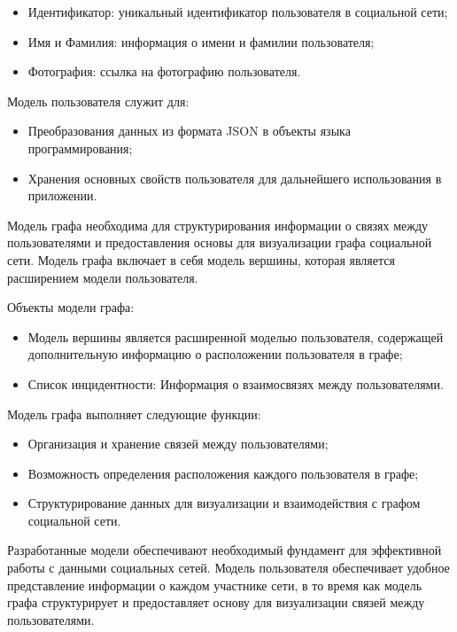 \documentclass[14pt, russian]{scrartcl}
\begin{document}
\begin{itemize}
	\item Идентификатор: уникальный идентификатор пользователя в социальной сети;
	\item Имя и Фамилия: информация о имени и фамилии пользователя;
	\item Фотография: ссылка на фотографию пользователя.
\end{itemize}


Модель пользователя служит для:

\begin{itemize}
	\item Преобразования данных из формата JSON в объекты языка программирования;
	\item Хранения основных свойств пользователя для дальнейшего использования в приложении.
\end{itemize}

Модель графа необходима для структурирования информации о связях между пользователями и предоставления основы для визуализации графа социальной сети. Модель графа включает в себя модель вершины, которая является расширением модели пользователя.


Объекты модели графа:

\begin{itemize}
	\item Модель вершины является расширенной моделью пользователя, содержащей дополнительную информацию о расположении пользователя в графе;
	\item Список инцидентности: Информация о взаимосвязях между пользователями.
\end{itemize}

Модель графа выполняет следующие функции:

\begin{itemize}
	\item Организация и хранение связей между пользователями;
	\item Возможность определения расположения каждого пользователя в графе;
	\item Структурирование данных для визуализации и взаимодействия с графом социальной сети.
\end{itemize}

Разработанные модели обеспечивают необходимый фундамент для эффективной работы с данными социальных сетей. Модель пользователя обеспечивает удобное представление информации о каждом участнике сети, в то время как модель графа структурирует и предоставляет основу для визуализации связей между пользователями.
\end{document}
